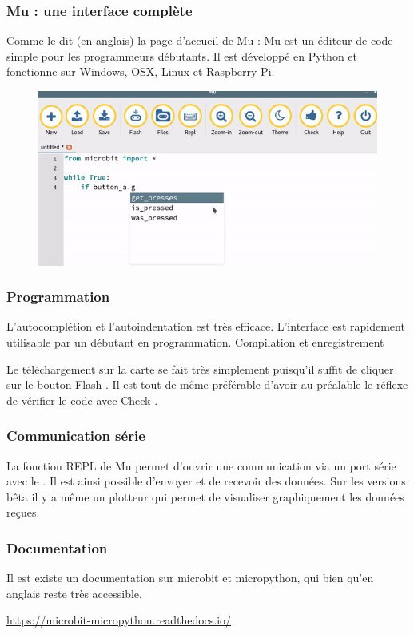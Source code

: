 \subsubsection{Mu : une interface complète}

Comme le dit (en anglais) la page d’accueil de Mu : Mu est un éditeur de code simple pour les programmeurs débutants. Il est développé en Python et fonctionne sur Windows, OSX, Linux et Raspberry Pi.


\begin{figure}[h]
    \centering
    \includegraphics[width=0.65\linewidth]{res/mb-prog3.png}
\end{figure}

\subsubsection{Programmation}

L’autocomplétion et l’autoindentation est très efficace. L’interface est rapidement utilisable par un débutant en programmation.
Compilation et enregistrement

Le téléchargement sur la carte se fait très simplement puisqu’il suffit de cliquer sur le bouton Flash . Il est tout de même préférable d’avoir au préalable le réflexe de vérifier le code avec Check .

\subsubsection{Communication série}

La fonction REPL de Mu permet d’ouvrir une communication via un port série avec le \mb. Il est ainsi possible d’envoyer et de recevoir des données. Sur les versions bêta il y a même un plotteur qui permet de visualiser graphiquement les données reçues.

\subsubsection{Documentation}

Il est existe un documentation sur microbit et micropython, qui bien qu’en anglais reste très accessible.

\url{https://microbit-micropython.readthedocs.io/}
